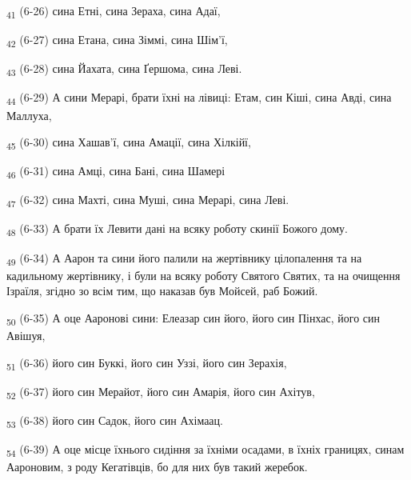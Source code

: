 \begin{tcolorbox}
\textsubscript{41} (6-26) сина Етні, сина Зераха, сина Адаї,
\end{tcolorbox}
\begin{tcolorbox}
\textsubscript{42} (6-27) сина Етана, сина Зіммі, сина Шім'ї,
\end{tcolorbox}
\begin{tcolorbox}
\textsubscript{43} (6-28) сина Йахата, сина Ґершома, сина Леві.
\end{tcolorbox}
\begin{tcolorbox}
\textsubscript{44} (6-29) А сини Мерарі, брати їхні на лівиці: Етам, син Кіші, сина Авді, сина Маллуха,
\end{tcolorbox}
\begin{tcolorbox}
\textsubscript{45} (6-30) сина Хашав'ї, сина Амації, сина Хілкійї,
\end{tcolorbox}
\begin{tcolorbox}
\textsubscript{46} (6-31) сина Амці, сина Бані, сина Шамері
\end{tcolorbox}
\begin{tcolorbox}
\textsubscript{47} (6-32) сина Махті, сина Муші, сина Мерарі, сина Леві.
\end{tcolorbox}
\begin{tcolorbox}
\textsubscript{48} (6-33) А брати їх Левити дані на всяку роботу скинії Божого дому.
\end{tcolorbox}
\begin{tcolorbox}
\textsubscript{49} (6-34) А Аарон та сини його палили на жертівнику цілопалення та на кадильному жертівнику, і були на всяку роботу Святого Святих, та на очищення Ізраїля, згідно зо всім тим, що наказав був Мойсей, раб Божий.
\end{tcolorbox}
\begin{tcolorbox}
\textsubscript{50} (6-35) А оце Ааронові сини: Елеазар син його, його син Пінхас, його син Авішуя,
\end{tcolorbox}
\begin{tcolorbox}
\textsubscript{51} (6-36) його син Буккі, його син Уззі, його син Зерахія,
\end{tcolorbox}
\begin{tcolorbox}
\textsubscript{52} (6-37) його син Мерайот, його син Амарія, його син Ахітув,
\end{tcolorbox}
\begin{tcolorbox}
\textsubscript{53} (6-38) його син Садок, його син Ахімаац.
\end{tcolorbox}
\begin{tcolorbox}
\textsubscript{54} (6-39) А оце місце їхнього сидіння за їхніми осадами, в їхніх границях, синам Аароновим, з роду Кегатівців, бо для них був такий жеребок.
\end{tcolorbox}
